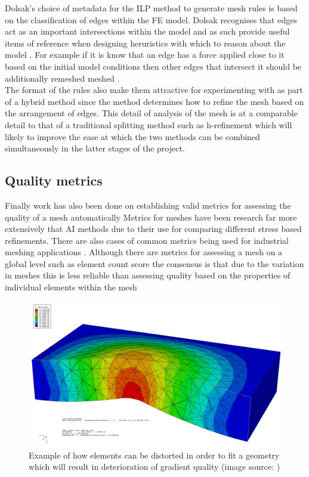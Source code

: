 \noindent
Dolsak's choice of metadata for the ILP method to generate mesh rules is based on the classification of edges within the FE model. Dolsak recognises that edges act as an important intersections within the model and as such provide useful items of reference when designing heruristics with which to reason about the model \cite{DolsakPaper94} \cite{appOfILPToFEMeshDesign}.  For example if it is know that an edge has a force applied close to it based on the initial model conditions then other edges that intersect it should be additionally remeshed meshed \cite{DolsakPaper91} \cite{appOfILPToFEMeshDesign}. \\ 

\noindent
The format of the rules also make them attractive for experimenting with as part of a hybrid method since the method determines how to refine the mesh based on the arrangement of edges. This detail of analysis of the mesh is at a comparable detail to that of a traditional splitting method such as h-refinement which will likely to improve the ease at which the two methods can be combined simultaneously in the latter stages of the project. \\ 

\subsection{Quality metrics}
\noindent
Finally work has also been done on establishing valid metrics for assessing the quality of a mesh automatically \cite{DittmerMeshQualityMet, NeuralNetworks} Metrics for meshes have been research far more extensively that AI methods due to their use for comparing different stress based refinements. There are also cases of common metrics being used for industrial meshing applications \cite{DittmerMeshQualityMet}. Although there are metrics for assessing a mesh on a global level such as element count score the consensus is that due to the variation in meshes this is less reliable than assessing quality based on the properties of individual elements within the mesh \cite{DittmerMeshQualityMet} \\

\begin{figure}
  \centerline{\includegraphics[width=120mm, scale=1]{../Graphics/MeshQualityDeterioration.png}}
  \caption{Example of how elements can be distorted in order to fit a geometry which will result in deterioration of gradient quality (image source: \cite{PoorFEElementShapes})}
\end{figure}


